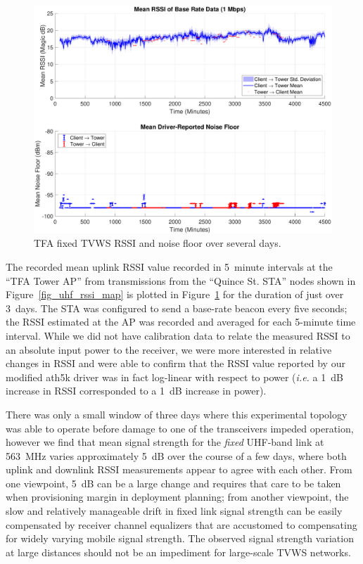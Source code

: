 \begin{figure}[p]
\centering
  	\includegraphics[width=1\linewidth]{figs/wardrive/TFA_long-term-rssi}   
   	\caption{TFA fixed TVWS \ac{RSSI} and noise floor over several days.
	\label{fig_uhf_siso_stability}}
\end{figure}

	The recorded mean uplink \ac{RSSI} value recorded in 5~minute intervals at the ``TFA Tower AP'' from transmissions from the ``Quince St. STA'' nodes shown in Figure~\ref{fig_uhf_rssi_map} is plotted in Figure~\ref{fig_uhf_siso_stability} for the duration of just over 3~days.
	The \ac{STA} was configured to send a base-rate beacon every five seconds; the \ac{RSSI} estimated at the \ac{AP} was recorded and averaged for each 5-minute time interval.
	While we did not have calibration data to relate the measured \ac{RSSI} to an absolute input power to the receiver, we were more interested in relative changes in \ac{RSSI} and were able to confirm that the \ac{RSSI} value reported by our modified ath5k driver was in fact log-linear with respect to power (\textit{i.e.} a 1~dB increase in \ac{RSSI} corresponded to a 1~dB increase in power).
	
	There was only a small window of three days where this experimental topology was able to operate before damage to one of the transceivers impeded operation, however we find that mean signal strength for the \emph{fixed} UHF-band link at 563~MHz varies approximately 5~dB over the course of a few days, where both uplink and downlink \ac{RSSI} measurements appear to agree with each other.
	From one viewpoint, 5~dB can be a large change and requires that care to be taken when provisioning margin in deployment planning; from another viewpoint, the slow and relatively manageable drift in fixed link signal strength can be easily compensated by receiver channel equalizers that are accustomed to compensating for widely varying mobile signal strength.
	The observed signal strength variation at large distances should not be an impediment for large-scale \ac{TVWS} networks.
	
